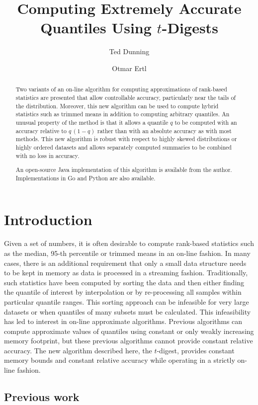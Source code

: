 \documentclass[11pt]{amsart}
\title{Computing Extremely Accurate Quantiles Using $t$-Digests}
\author{Ted Dunning}
\author{Otmar Ertl}
\date{}                                           %
\begin{document}
\begin{abstract}
Two variants of an on-line algorithm for computing approximations of rank-based statistics are presented that allow controllable accuracy, particularly near the tails of the distribution.  Moreover, this new algorithm can be used to compute hybrid statistics such as trimmed means in addition to computing arbitrary quantiles.  An unusual property of the method is that it allows a quantile $q$ to be computed with an accuracy relative to $q\,( 1-q)$ rather than with an absolute accuracy as with most methods.  This new algorithm is robust with respect to highly skewed distributions or highly ordered datasets and allows separately computed summaries to be combined with no loss in accuracy.

An open-source Java implementation of this algorithm is available from the author. Implementations in Go and Python are also available.
\end{abstract}
\maketitle
\section{Introduction}
Given a set of numbers, it is often desirable to compute rank-based statistics such as the median, 95-th percentile or trimmed means in an on-line fashion. In many cases, there is an additional requirement that only a small data structure needs to be kept in memory as data is processed in a streaming fashion.  Traditionally, such statistics have been computed by sorting the data and then either finding the quantile of interest by interpolation or by re-processing all samples within particular quantile ranges.  This sorting approach can be infeasible for very large datasets or when quantiles of many subsets must be calculated. This infeasibility has led to interest in on-line approximate algorithms. Previous algorithms can compute approximate values of quantiles using constant or only weakly increasing memory footprint, but these previous algorithms cannot provide constant relative accuracy.  The new algorithm described here, the $t$-digest, provides constant memory bounds and constant relative accuracy while operating in a strictly on-line fashion.

\subsection{Previous work}
\end{document}
